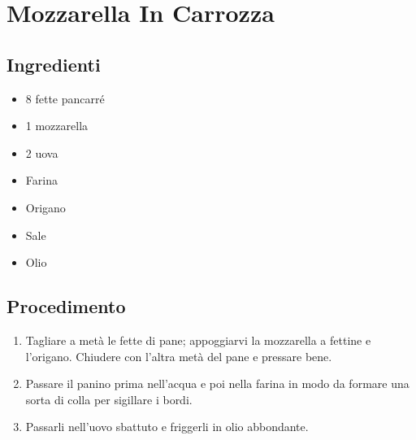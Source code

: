 \section{Mozzarella In Carrozza}
\subsection{Ingredienti}
\begin{itemize}
\item 8 fette pancarré  
\item 1 mozzarella  
\item 2 uova  
\item Farina  
\item Origano  
\item Sale  
\item Olio
\end{itemize}
\subsection{Procedimento}
\begin{enumerate}
\item  Tagliare a metà le fette di pane; appoggiarvi la mozzarella a fettine e l'origano. Chiudere con l'altra metà del pane e pressare bene.  
\item  Passare il panino prima nell'acqua e poi nella farina in modo da formare una sorta di colla per sigillare i bordi.  
\item  Passarli nell'uovo sbattuto e friggerli in olio abbondante.
\end{enumerate}
